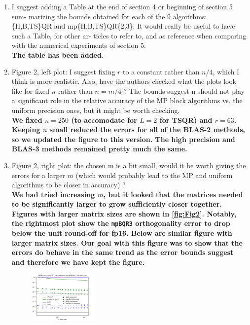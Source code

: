 \documentclass[final,onefignum,onetabnum]{siamart190516}
\begin{document}
\begin{enumerate}
\begin{itemize}
    \end{itemize}
    {\bf We have discussed the above two points in this part of the discussion.}
    \item I suggest adding a Table at the end of section 4 or beginning of section 5 sum- marizing the bounds obtained for each of the 9 algorithms: \{H,B,TS\}QR and mp\{H,B,TS\}QR\{2,3\}. It would really be useful to have such a Table, for other ar- ticles to refer to, and as reference when comparing with the numerical experiments of section 5.\\
    {\bf The table has been added.}
    \item Figure 2, left plot: I suggest fixing $r$ to a constant rather than $n/4$, which I think is more realistic. Also, have the authors checked what the plots look like for fixed $n$ rather than $n = m/4$ ? The bounds suggest n should not play a significant role in the relative accuracy of the MP block algorithms vs. the uniform precision ones, but it might be worth checking.\\
    {\bf We fixed $n=250$ (to accomodate for $L=2$ for TSQR) and $r=63$. Keeping $n$ small reduced the errors for all of the BLAS-2 methods, so we updated the figure to this version. The high precision and BLAS-3 methods remained pretty much the same. }
    \item Figure 2, right plot: the chosen m is a bit small, would it be worth giving the errors for a larger $m$ (which would probably lead to the MP and uniform algorithms to be closer in accuracy) ?\\
    {\bf We had tried increasing $m$, but it looked that the matrices needed to be significantly larger to grow sufficiently closer together. Figures with larger matrix sizes are shown in \cref{fig:Fig2}. Notably, the rightmost plot show the {\tt mpBQR3} orthogonality error to drop below the unit round-off for fp16. Below are similar figure with larger matrix sizes. Our goal with this figure was to show that the errors do behave in the same trend as the error bounds suggest and therefore we have kept the figure.}
    \begin{figure}[h!]
        \centering
        \vspace{-10pt}
        \includegraphics[width=0.32\textwidth]{./figures/12-08.png}

\end{figure}
\end{enumerate}
\end{document}
